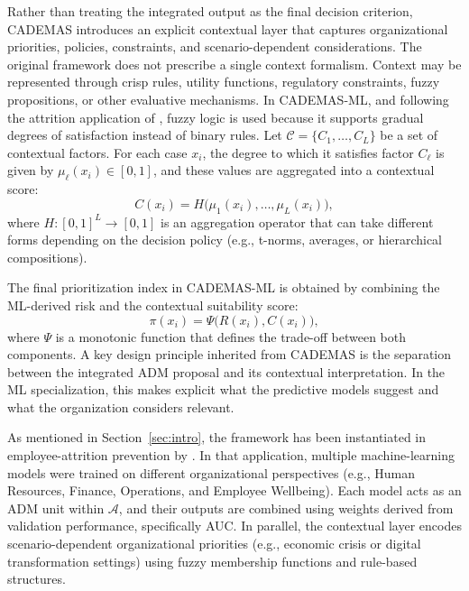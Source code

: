 \documentclass[journal,article,submit,pdftex,moreauthors,mathematics]{Definitions/mdpi}
\begin{document}
Rather than treating the integrated output as the final decision criterion, CADEMAS introduces an explicit contextual layer that captures organizational priorities, policies, constraints, and scenario-dependent considerations. The original framework does not prescribe a single context formalism. Context may be represented through crisp rules, utility functions, regulatory constraints, fuzzy propositions, or other evaluative mechanisms. In CADEMAS-ML, and following the attrition application of \citet{Godz2026}, fuzzy logic is used because it supports gradual degrees of satisfaction instead of binary rules. Let $\mathcal{C} = \{C_1, \dots, C_L\}$ be a set of contextual factors. For each case $x_i$, the degree to which it satisfies factor $C_\ell$ is given by $\mu_\ell(x_i) \in [0,1]$, and these values are aggregated into a contextual score:
\begin{equation}
C(x_i) = H\big(\mu_1(x_i), \dots, \mu_L(x_i)\big),    
\end{equation}
where $H: [0,1]^L \rightarrow [0,1]$ is an aggregation operator that can take different forms depending on the decision policy (e.g., t-norms, averages, or hierarchical compositions).

The final prioritization index in CADEMAS-ML is obtained by combining the ML-derived risk and the contextual suitability score:
\begin{equation}
\pi(x_i) = \Psi\big(R(x_i), C(x_i)\big),    
\end{equation}
where $\Psi$ is a monotonic function that defines the trade-off between both components. A key design principle inherited from CADEMAS is the separation between the integrated ADM proposal and its contextual interpretation. In the ML specialization, this makes explicit what the predictive models suggest and what the organization considers relevant.

As mentioned in Section~\ref{sec:intro}, the framework has been instantiated in employee-attrition prevention by \citet{Godz2026}. In that application, multiple machine-learning models were trained on different organizational perspectives (e.g., Human Resources, Finance, Operations, and Employee Wellbeing). Each model acts as an ADM unit within $\mathcal{A}$, and their outputs are combined using weights derived from validation performance, specifically AUC. In parallel, the contextual layer encodes scenario-dependent organizational priorities (e.g., economic crisis or digital transformation settings) using fuzzy membership functions and rule-based structures.
\end{document}
